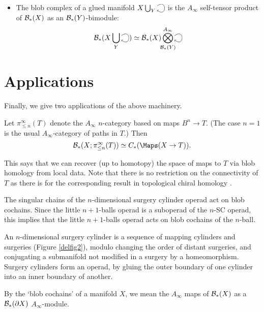 \documentclass{pnastwo}
\begin{document}
\begin{article}
\begin{thm}
\begin{itemize}
\item The blob complex of a glued manifold $X\bigcup_Y \selfarrow$ is the $A_\infty$ self-tensor product of
${\mathcal B}_*(X)$ as an ${\mathcal B}_*(Y)$-bimodule:
\begin{equation*}
\bc_*(X\bigcup_Y \selfarrow) \simeq \bc_*(X) \Tensor^{A_\infty}_{\mathclap{\bc_*(Y)}} \selfarrow
\end{equation*}
\end{itemize}
\end{thm}


\section{Applications}
\label{sec:applications}
Finally, we give two applications of the above machinery.

\begin{thm}
\label{thm:map-recon}
Let $\pi^\infty_{\le n}(T)$ denote the $A_\infty$ $n$-category based on maps 
$B^n \to T$.
(The case $n=1$ is the usual $A_\infty$-category of paths in $T$.)
Then 
$$\bc_*(X; \pi^\infty_{\le n}(T)) \simeq \CM{X}{T}.$$
\end{thm}

This says that we can recover (up to homotopy) the space of maps to $T$ via blob homology from local data. 
Note that there is no restriction on the connectivity of $T$ as there is for the corresponding result in topological chiral homology \cite[Theorem 3.8.6]{0911.0018}.

\begin{thm}
\label{thm:deligne}
The singular chains of the $n$-dimensional surgery cylinder operad act on blob cochains.
Since the little $n{+}1$-balls operad is a suboperad of the $n$-SC operad,
this implies that the little $n{+}1$-balls operad acts on blob cochains of the $n$-ball.
\end{thm}

An $n$-dimensional surgery cylinder is a sequence of mapping cylinders and surgeries (Figure \ref{delfig2}), modulo changing the order of distant surgeries, and conjugating a submanifold not modified in a surgery by a homeomorphism. Surgery cylinders form an operad, by gluing the outer boundary of one cylinder into an inner boundary of another.

By the `blob cochains' of a manifold $X$, we mean the $A_\infty$ maps of ${\mathcal B}_*(X)$ as a ${\mathcal B}_*(\partial X)$ $A_\infty$-module.


\end{article}
\end{document}
